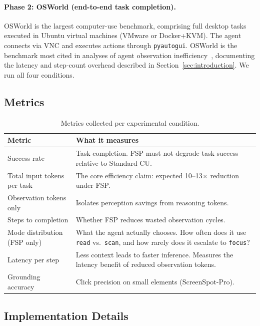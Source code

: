 \documentclass[11pt,a4paper]{article}
\begin{document}
\paragraph{Phase 2: OSWorld (end-to-end task completion).}
OSWorld \cite{osworld} is the largest computer-use benchmark, comprising full desktop tasks executed in Ubuntu virtual machines (VMware or Docker+KVM). The agent connects via VNC and executes actions through \texttt{pyautogui}. OSWorld is the benchmark most cited in analyses of agent observation inefficiency~\cite{osworld-human}, documenting the latency and step-count overhead described in Section~\ref{sec:introduction}. We run all four conditions.

\subsection{Metrics}

\begin{table}[h]
\centering
\caption{Metrics collected per experimental condition.}
\label{tab:metrics}
\begin{tabular}{lp{8.5cm}}
\toprule
\textbf{Metric} & \textbf{What it measures} \\
\midrule
Success rate & Task completion. FSP must not degrade task success relative to Standard CU. \\
Total input tokens per task & The core efficiency claim: expected 10--13$\times$ reduction under FSP. \\
Observation tokens only & Isolates perception savings from reasoning tokens. \\
Steps to completion & Whether FSP reduces wasted observation cycles. \\
Mode distribution (FSP only) & What the agent actually chooses. How often does it use \texttt{read} vs.\ \texttt{scan}, and how rarely does it escalate to \texttt{focus}? \\
Latency per step & Less context leads to faster inference. Measures the latency benefit of reduced observation tokens. \\
Grounding accuracy & Click precision on small elements (ScreenSpot-Pro). \\
\bottomrule
\end{tabular}
\end{table}

\subsection{Implementation Details}
\end{document}
